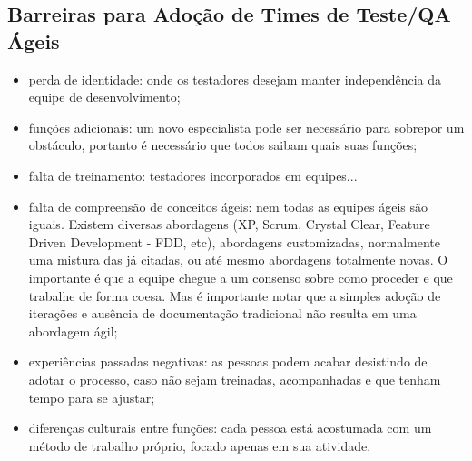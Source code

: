 \documentclass[
	12pt,				%
	openright,			%
	oneside,			%
	a4paper,			%
	english,			%
	brazil,				%
	]{abntex2}
\begin{document}

\subsection{Barreiras para Adoção de Times de Teste/QA Ágeis}
\begin{itemize}
    \item perda de identidade: onde os testadores desejam manter independência da equipe de desenvolvimento;
    \item funções adicionais: um novo especialista pode ser necessário para sobrepor um obstáculo, portanto é necessário que todos saibam quais suas funções; %
    \item falta de treinamento: testadores incorporados em equipes... %
    \item falta de compreensão de conceitos ágeis: nem todas as equipes ágeis são iguais. Existem diversas abordagens (XP, Scrum, Crystal Clear, Feature Driven Development - FDD, etc), abordagens customizadas, normalmente uma mistura das já citadas, ou até mesmo abordagens totalmente novas. O importante é que a equipe chegue a um consenso sobre como proceder e que trabalhe de forma coesa. Mas é importante notar que a simples adoção de iterações e ausência de documentação tradicional não resulta em uma abordagem ágil; %
    \item experiências passadas negativas: as pessoas podem acabar desistindo de adotar o processo, caso não sejam treinadas, acompanhadas e que tenham tempo para se ajustar;
    \item diferenças culturais entre funções: cada pessoa está acostumada com um método de trabalho próprio, focado apenas em sua atividade.
\end{itemize}

\end{document}
